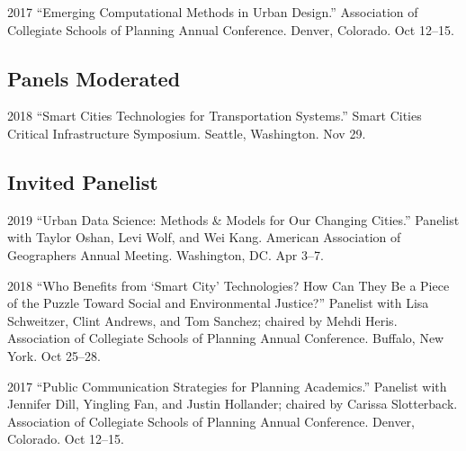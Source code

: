 \documentclass[12pt,letterpaper]{report}
\begin{document}
	\begin{tablist}
		
		\item[2017] \tab \enquote{Emerging Computational Methods in Urban Design.} Association of Collegiate Schools of Planning Annual Conference. Denver, Colorado. Oct 12--15.
		
	\end{tablist}
	
	\subsection*{Panels Moderated}
	
	\begin{tablist}
		
		\item[2018] \tab \enquote{Smart Cities Technologies for Transportation Systems.} Smart Cities Critical Infrastructure Symposium. Seattle, Washington. Nov 29.
		
	\end{tablist}
	
	\subsection*{Invited Panelist}
	
	\begin{tablist}
		
		\item[2019] \tab \enquote{Urban Data Science: Methods \& Models for Our Changing Cities.} Panelist with Taylor Oshan, Levi Wolf, and Wei Kang. American Association of Geographers Annual Meeting. Washington, DC. Apr 3--7.
		
		\item[2018] \tab \enquote{Who Benefits from \enquote{Smart City} Technologies? How Can They Be a Piece of the Puzzle Toward Social and Environmental Justice?} Panelist with Lisa Schweitzer, Clint Andrews, and Tom Sanchez; chaired by Mehdi Heris. Association of Collegiate Schools of Planning Annual Conference. Buffalo, New York. Oct 25--28.
		
		\item[2017] \tab \enquote{Public Communication Strategies for Planning Academics.} Panelist with Jennifer Dill, Yingling Fan, and Justin Hollander; chaired by Carissa Slotterback. Association of Collegiate Schools of Planning Annual Conference. Denver, Colorado. Oct 12--15.
		
	\end{tablist}
	
\end{document}
